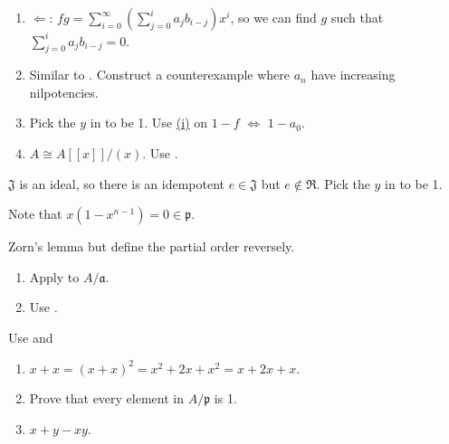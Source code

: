 \begin{exercise}\label{ex1.5}
	\begin{enumerate}[label=(\roman*),ref=\theexercise(\roman*)]
		\item\label{ex1.5.1} $\Leftarrow$: $fg=\sum_{i=0}^\infty\left(\sum_{j=0}^ia_jb_{i-j}\right)x^i$, so we can find $g$ such that $\sum_{j=0}^ia_jb_{i-j}=0$.
		\item\label{ex1.5.2} Similar to . Construct a counterexample where $a_n$ have increasing nilpotencies.
		\item Pick the $y$ in  to be 1. Use \hyperref[ex1.5.1]{(i)} on $1-f$ $\Leftrightarrow$ $1-a_0$.
		\item[(iv),(v)] $A\cong A[[x]]/(x)$. Use .
	\end{enumerate}
\end{exercise}

\begin{exercise}\label{ex1.6}
	$\mathfrak{J}$ is an ideal, so there is an idempotent $e\in\mathfrak{J}$ but $e\notin\mathfrak{R}$. Pick the $y$ in  to be 1.
\end{exercise}

\begin{exercise}\label{ex1.7}
	Note that $x\left(1-x^{n-1}\right)=0\in\mathfrak{p}$.
\end{exercise}

\begin{exercise}\label{ex1.8}
	Zorn's lemma but define the partial order reversely.
\end{exercise}

\begin{exercise}\label{ex1.9}
	\begin{enumerate}
		\item[$\Rightarrow$:] Apply  to $A/\mathfrak{a}$.
		\item[$\Leftarrow$:] Use .
	\end{enumerate}
\end{exercise}

\begin{exercise}\label{ex1.10}
	Use  and 
\end{exercise}

\begin{exercise}\label{ex1.11}
	\begin{enumerate}[label=(\roman*),ref=\theexercise(\roman*)]
		\item $x+x=(x+x)^2=x^2+2x+x^2=x+2x+x$.
		\item Prove that every element in $A/\mathfrak{p}$ is 1.
		\item\label{ex1.11.3} $x+y-xy$.
	\end{enumerate}
\end{exercise}

